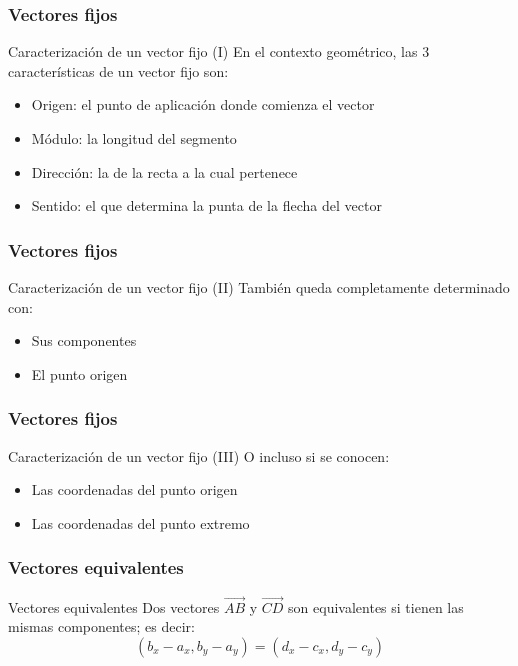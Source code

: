 \documentclass{beamer}
\begin{document}
\begin{frame}
  \frametitle{Vectores fijos}
  \begin{block}{Caracterizaci\'on de un vector fijo (I)}
En el contexto geom\'etrico, las 3 caracter\'isticas de un vector fijo son:
\begin{itemize}
\item Origen: el punto de aplicaci\'on donde comienza el vector
\item M\'odulo: la longitud del segmento
\item Direcci\'on: la de la recta a la cual pertenece
\item Sentido: el que determina la punta de la flecha del vector
\end{itemize}
\end{block}
\end{frame}

\begin{frame}
  \frametitle{Vectores fijos}
  \begin{block}{Caracterizaci\'on de un vector fijo (II)}
Tambi\'en queda completamente determinado con:
\begin{itemize}
\item Sus componentes
\item El punto origen
\end{itemize}
\end{block}
\end{frame}

\begin{frame}
  \frametitle{Vectores fijos}
  \begin{block}{Caracterizaci\'on de un vector fijo (III)}
O incluso si se conocen:
\begin{itemize}
\item Las coordenadas del punto origen
\item Las coordenadas del punto extremo
\end{itemize}
\end{block}
\end{frame}





\begin{frame}
  \frametitle{Vectores equivalentes}
  \begin{block}{Vectores equivalentes}
Dos vectores $\vec{AB}$ y $\vec{CD}$ son equivalentes si tienen las mismas componentes; es decir:
\[(b_x-a_x,b_y-a_y) = (d_x-c_x,d_y-c_y)\]
\end{block}
\end{frame}
\end{document}
